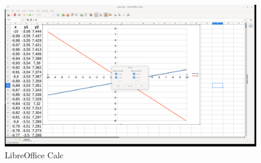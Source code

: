 \begin{figure}[h!]		
	\centering
   	\includegraphics[width=8.0in]{pictures/picture_025.png}
  	\caption{LibreOffice Calc}
   	\label{fig:LibreOfficeCalc025}
\end{figure}